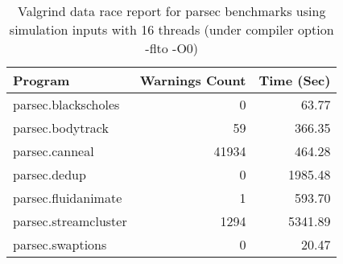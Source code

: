 \begin{table}[htdp]
\begin{center}
\begin{tabular}{|l|r|r|}
\hline
Program  & Warnings Count & Time (Sec) \\ \hline
parsec.blackscholes &  0 & 63.77 \\ \hline
parsec.bodytrack & 59 & 366.35\\ \hline 
parsec.canneal & 41934 & 464.28 \\ \hline
parsec.dedup & 0 & 1985.48	\\ \hline
parsec.fluidanimate & 1 & 593.70 \\ \hline
parsec.streamcluster & 1294 & 5341.89 \\ \hline
parsec.swaptions & 0 & 20.47 \\ \hline
\end{tabular}
\end{center}
\caption{Valgrind data race report for parsec benchmarks using simulation inputs with 16 threads (under compiler option -flto -O0)}
\label{valgrind}
\end{table}%



